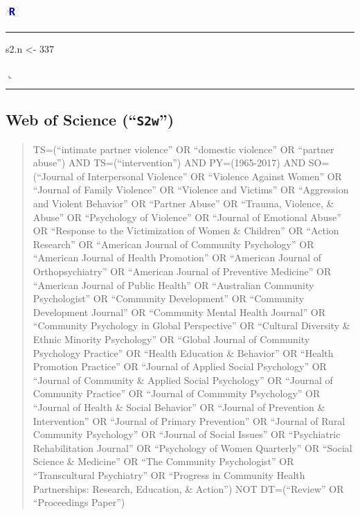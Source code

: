 \documentclass[]{tufte-handout}
\newenvironment{Shaded}{}{}
\newcommand{\DecValTok}[1]{{#1}}
\newcommand{\StringTok}[1]{{#1}}
\newcommand{\NormalTok}[1]{{#1}}
\newcommand{\Rrule}{
    \vspace*{1em}
    \noindent
    \hspace{-1em}
    \includegraphics[width=0.5cm]{auxDocs/Rlogo.png}
    \textcolor{Rblue}{
        \rule[0.1in]{0.90\linewidth}{0.02mm}
    }
    \vspace{-1.35em}
}
\newcommand{\Rerule}{
    \noindent
    \hspace{-1em}
    \textcolor{Rblue}{
        $\llcorner$\rule[-0.4mm]{\linewidth}{0.02mm}
    }
}
\begin{document}
\Rrule

\begin{Shaded}
\begin{Highlighting}[]
\NormalTok{s2.n <-}\StringTok{ }\DecValTok{337}
\end{Highlighting}
\end{Shaded}

\Rerule

\subsection{\texorpdfstring{Web of Science
(``\texttt{S2w}'')}{Web of Science (S2w)}}\label{web-of-science-s2w}

\begin{quote}
TS=(``intimate partner violence'' OR ``domestic violence'' OR ``partner
abuse'') AND TS=(``intervention'') AND PY=(1965-2017) AND SO=(``Journal
of Interpersonal Violence'' OR ``Violence Against Women'' OR ``Journal
of Family Violence'' OR ``Violence and Victims'' OR ``Aggression and
Violent Behavior'' OR ``Partner Abuse'' OR ``Trauma, Violence, \&
Abuse'' OR ``Psychology of Violence'' OR ``Journal of Emotional Abuse''
OR ``Response to the Victimization of Women \& Children'' OR ``Action
Research'' OR ``American Journal of Community Psychology'' OR ``American
Journal of Health Promotion'' OR ``American Journal of Orthopsychiatry''
OR ``American Journal of Preventive Medicine'' OR ``American Journal of
Public Health'' OR ``Australian Community Psychologist'' OR ``Community
Development'' OR ``Community Development Journal'' OR ``Community Mental
Health Journal'' OR ``Community Psychology in Global Perspective'' OR
``Cultural Diversity \& Ethnic Minority Psychology'' OR ``Global Journal
of Community Psychology Practice'' OR ``Health Education \& Behavior''
OR ``Health Promotion Practice'' OR ``Journal of Applied Social
Psychology'' OR ``Journal of Community \& Applied Social Psychology'' OR
``Journal of Community Practice'' OR ``Journal of Community Psychology''
OR ``Journal of Health \& Social Behavior'' OR ``Journal of Prevention
\& Intervention'' OR ``Journal of Primary Prevention'' OR ``Journal of
Rural Community Psychology'' OR ``Journal of Social Issues'' OR
``Psychiatric Rehabilitation Journal'' OR ``Psychology of Women
Quarterly'' OR ``Social Science \& Medicine'' OR ``The Community
Psychologist'' OR ``Transcultural Psychiatry'' OR ``Progress in
Community Health Partnerships: Research, Education, \& Action'') NOT
DT=(``Review'' OR ``Proceedings Paper'')
\end{quote}
\end{document}
